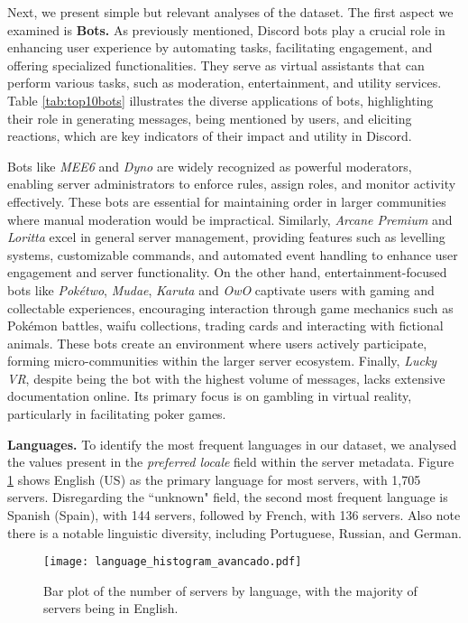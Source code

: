Next, we present simple but relevant analyses of the dataset. The first aspect we examined is \textbf{Bots.} As previously mentioned, Discord bots play a crucial role in enhancing user experience by automating tasks, facilitating engagement, and offering specialized functionalities. They serve as virtual assistants that can perform various tasks, such as moderation, entertainment, and utility services. Table \ref{tab:top10bots} illustrates the diverse applications of bots, highlighting their role in generating messages, being mentioned by users, and eliciting reactions, which are key indicators of their impact and utility in Discord.

Bots like \textit{MEE6} and \textit{Dyno} are widely recognized as powerful moderators, enabling server administrators to enforce rules, assign roles, and monitor activity effectively. These bots are essential for maintaining order in larger communities where manual moderation would be impractical. Similarly, \textit{Arcane Premium} and \textit{Loritta} excel in general server management, providing features such as levelling systems, customizable commands, and automated event handling to enhance user engagement and server functionality. On the other hand, entertainment-focused bots like \textit{Pokétwo}, \textit{Mudae}, \textit{Karuta} and \textit{OwO} captivate users with gaming and collectable experiences, encouraging interaction through game mechanics such as Pokémon battles, waifu collections, trading cards and interacting with fictional animals. These bots create an environment where users actively participate, forming micro-communities within the larger server ecosystem. Finally, \textit{Lucky VR}, despite being the bot with the highest volume of messages, lacks extensive documentation online. Its primary focus is on gambling in virtual reality, particularly in facilitating poker games.

\textbf{Languages.} To identify the most frequent languages in our dataset, we analysed the values present in the \textit{preferred locale} field within the server metadata. Figure \ref{fig:hist-linguas} shows English (US) as the primary language for most servers, with 1,705 servers. Disregarding the ``unknown" field, the second most frequent language is Spanish (Spain), with 144 servers, followed by French, with 136 servers. Also note there is a notable linguistic diversity, including Portuguese, Russian, and German.

\begin{figure}[t]
    \centering
    \texttt{[image: language\_histogram\_avancado.pdf]}
    \caption{Bar plot of the number of servers by language, with the majority of servers being in English.}
    \label{fig:hist-linguas}
\end{figure}


